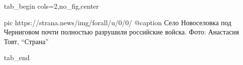  
 
 
 
 


\ifcmt
  tab_begin cols=2,no_fig,center

     pic https://strana.news/img/forall/u/0/0/%
		 @caption Село Новоселовка под Черниговом почти полностью разрушили российские войска. Фото: Анастасия Товт, \enquote{Страна}

  tab_end
\fi
